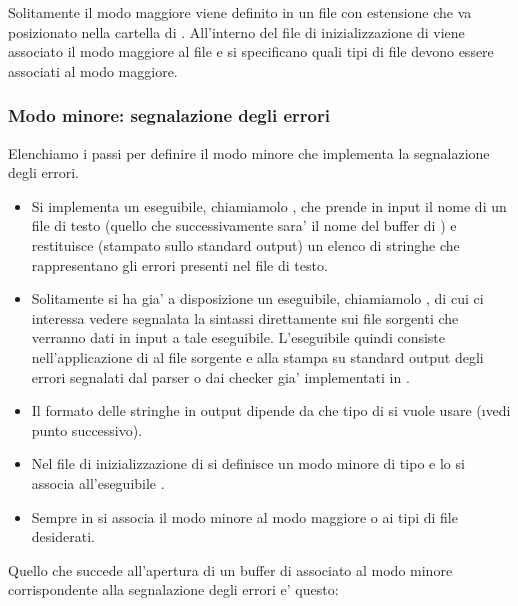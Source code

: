 Solitamente il modo maggiore viene definito in un file con estensione  che va posizionato nella cartella  di . All'interno del file di inizializzazione  di  viene associato il modo maggiore al file  e si specificano quali tipi di file devono essere associati al modo maggiore.

\subsubsection{Modo minore: segnalazione degli errori}

Elenchiamo i passi per definire il modo minore che implementa la segnalazione degli errori.

\begin{itemize}
\item[\bbox] Si implementa un eseguibile, chiamiamolo , che prende in input il nome di un file di testo (quello che successivamente sara' il nome del buffer di ) e restituisce (stampato sullo standard output) un elenco di stringhe che rappresentano gli errori presenti nel file di testo.
\item[] Solitamente si ha gia' a disposizione un eseguibile, chiamiamolo , di cui ci interessa vedere segnalata la sintassi direttamente sui file sorgenti che verranno dati in input a tale eseguibile. L'eseguibile  quindi consiste nell'applicazione di  al file sorgente e alla stampa su standard output degli errori segnalati dal parser o dai checker gia' implementati in .
\item[] Il formato delle stringhe in output dipende da che tipo di  si vuole usare (\i{vedi punto successivo}).
\item[\bbox] Nel file di inizializzazione  di  si definisce un modo minore di tipo  e lo si associa all'eseguibile .
\item[] Sempre in  si associa il modo minore  al modo maggiore o ai tipi di file desiderati.
\end{itemize}

Quello che succede all'apertura di un buffer di  associato al modo minore corrispondente alla segnalazione degli errori e' questo:

